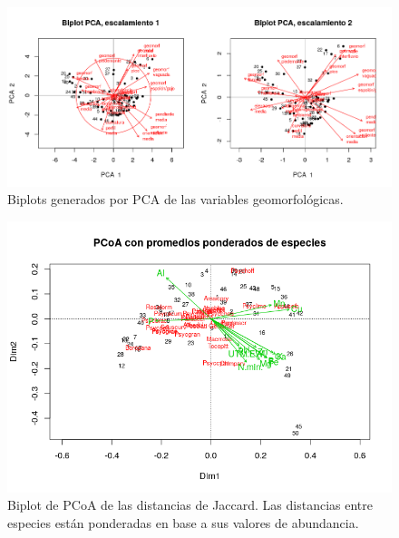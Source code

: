 \documentclass[11pt,]{article}
\begin{document}
\begin{figure}
\centering
\includegraphics{pca_biplot_geomorf.png}
\caption{Biplots generados por PCA de las variables geomorfológicas.
\label{fig:pca_biplot_geomorf}}
\end{figure}

\begin{figure}
\centering
\includegraphics{pcoa_sps_jacc_var_ambient.png}
\caption{Biplot de PCoA de las distancias de Jaccard. Las distancias
entre especies están ponderadas en base a sus valores de abundancia.
\label{fig:pcoa_sps_jacc_var_ambient}}
\end{figure}
\end{document}
